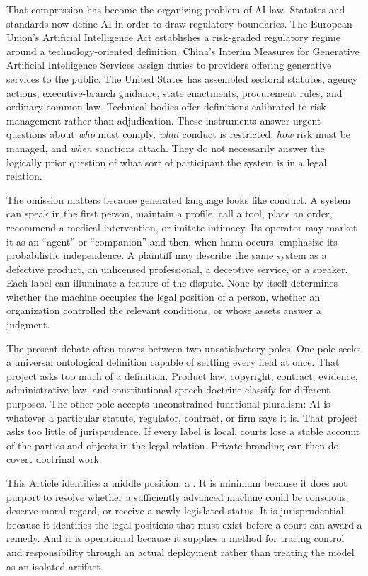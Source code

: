 That compression has become the organizing problem of AI law. Statutes and standards now define AI in order to draw regulatory boundaries. The European Union's Artificial Intelligence Act establishes a risk-graded regulatory regime around a technology-oriented definition. China's Interim Measures for Generative Artificial Intelligence Services assign duties to providers offering generative services to the public. The United States has assembled sectoral statutes, agency actions, executive-branch guidance, state enactments, procurement rules, and ordinary common law. Technical bodies offer definitions calibrated to risk management rather than adjudication. These instruments answer urgent questions about \emph{who} must comply, \emph{what} conduct is restricted, \emph{how} risk must be managed, and \emph{when} sanctions attach. They do not necessarily answer the logically prior question of what sort of participant the system is in a legal relation.

The omission matters because generated language looks like conduct. A system can speak in the first person, maintain a profile, call a tool, place an order, recommend a medical intervention, or imitate intimacy. Its operator may market it as an ``agent'' or ``companion'' and then, when harm occurs, emphasize its probabilistic independence. A plaintiff may describe the same system as a defective product, an unlicensed professional, a deceptive service, or a speaker. Each label can illuminate a feature of the dispute. None by itself determines whether the machine occupies the legal position of a person, whether an organization controlled the relevant conditions, or whose assets answer a judgment.

The present debate often moves between two unsatisfactory poles. One pole seeks a universal ontological definition capable of settling every field at once. That project asks too much of a definition. Product law, copyright, contract, evidence, administrative law, and constitutional speech doctrine classify for different purposes. The other pole accepts unconstrained functional pluralism: AI is whatever a particular statute, regulator, contract, or firm says it is. That project asks too little of jurisprudence. If every label is local, courts lose a stable account of the parties and objects in the legal relation. Private branding can then do covert doctrinal work.

This Article identifies a middle position: a . It is minimum because it does not purport to resolve whether a sufficiently advanced machine could be conscious, deserve moral regard, or receive a newly legislated status. It is jurisprudential because it identifies the legal positions that must exist before a court can award a remedy. And it is operational because it supplies a method for tracing control and responsibility through an actual deployment rather than treating the model as an isolated artifact.

